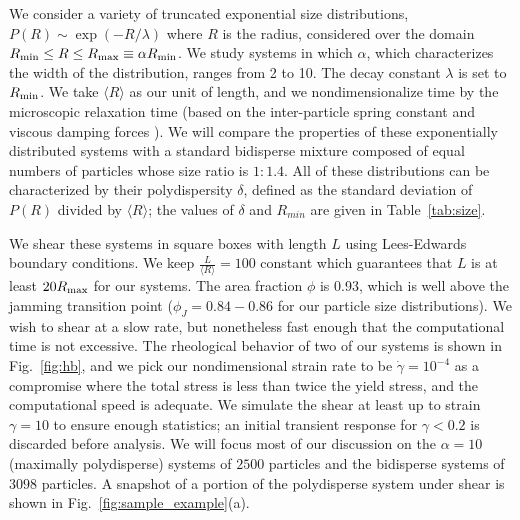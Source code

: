 \documentclass[%
 reprint,
 amsmath,amssymb,
 aps,
]{revtex4-2}
\begin{document}
We consider a variety of truncated exponential size distributions, $P(R) \sim \exp(-R/\lambda)$ where $R$ is the radius, considered over the domain $R_{\rm min} \leq R \leq R_{\rm max} \equiv \alpha R_{\rm min}$. We study systems in which $\alpha$, which characterizes the width of the distribution, ranges from 2 to 10. The decay constant $\lambda$ is set to $R_{\rm min}$. We take $\langle R \rangle$ as our unit of length, and we nondimensionalize time by the microscopic relaxation time (based on the inter-particle spring constant and viscous damping forces \cite{durian95}). We will compare the properties  of these exponentially distributed systems with a standard bidisperse mixture composed of equal numbers of particles whose size ratio is $1 : 1.4$. All of these distributions can be characterized by their polydispersity $\delta$, defined as the standard deviation of $P(R)$ divided by $\langle R \rangle$; the values of $\delta$ and $R_{min}$ are given in Table~\ref{tab:size}. 

We shear these systems in square boxes with length $L$ using Lees-Edwards boundary conditions. We keep $\frac{L}{\langle R \rangle} = 100$ constant which guarantees that $L$ is at least $20R_{\rm max}$  for our systems. The area fraction $\phi$ is 0.93, which is well above the jamming transition point ($\phi_J= 0.84 - 0.86$ for our particle size distributions).  We wish to shear at a slow rate, but nonetheless fast enough that the computational time is not excessive.  The rheological behavior of two of our systems is shown in Fig.~\ref{fig:hb}, and we pick our nondimensional strain rate to be $\dot{\gamma} = 10^{-4}$ as a compromise where the total stress is less than twice the yield stress, and the computational speed is adequate.  We simulate the shear at least up to strain $\gamma=10$ to ensure enough statistics; an initial transient response for $\gamma < 0.2$ is discarded before analysis.   We will focus most of our discussion on the $\alpha=10$ (maximally polydisperse) systems of $2500$ particles and the bidisperse systems of $3098$ particles. A snapshot of a portion of the polydisperse system under shear is shown in Fig.~\ref{fig:sample_example}(a).
\end{document}
